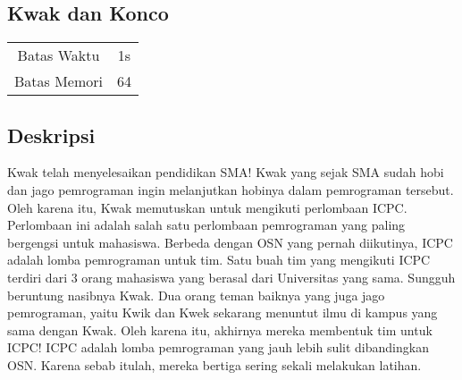 \documentclass{article}
\begin{document}
\begin{center}
    \section*{Kwak dan Konco} %

    \begin{tabular}{ | c c | }
        \hline
        Batas Waktu  & 1s \\    %
        Batas Memori & 64 \\  %
        \hline
    \end{tabular}
\end{center}

\subsection*{Deskripsi}



Kwak telah menyelesaikan pendidikan SMA! Kwak yang sejak SMA sudah hobi dan jago pemrograman ingin melanjutkan hobinya dalam pemrograman tersebut. Oleh karena itu, Kwak memutuskan untuk mengikuti perlombaan ICPC. Perlombaan ini adalah salah satu perlombaan pemrograman yang paling bergengsi untuk mahasiswa.
Berbeda dengan OSN yang pernah diikutinya, ICPC adalah lomba pemrograman untuk tim. Satu buah tim yang mengikuti ICPC terdiri dari 3 orang mahasiswa yang berasal dari Universitas yang sama. Sungguh beruntung nasibnya Kwak. Dua orang teman baiknya yang juga jago pemrograman, yaitu Kwik dan Kwek sekarang menuntut ilmu di kampus yang sama dengan Kwak. Oleh karena itu, akhirnya mereka membentuk tim untuk ICPC!
ICPC adalah lomba pemrograman yang jauh lebih sulit dibandingkan OSN. Karena sebab itulah, mereka bertiga sering sekali melakukan latihan.
\end{document}
